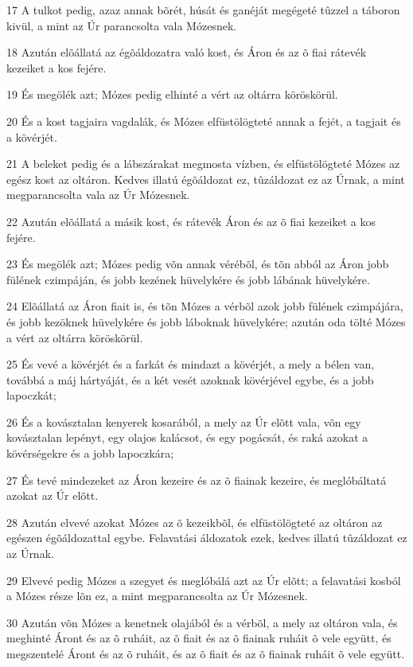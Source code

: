 \par 17 A tulkot pedig, azaz annak bõrét, húsát és ganéját megégeté tûzzel a táboron kivül, a mint az Úr parancsolta vala Mózesnek.
\par 18 Azután elõállatá az égõáldozatra való kost, és Áron és az õ fiai rátevék kezeiket a kos fejére.
\par 19 És megölék azt; Mózes pedig elhinté a vért az oltárra köröskörül.
\par 20 És a kost tagjaira vagdalák, és Mózes elfüstölögteté annak a fejét, a tagjait és a kövérjét.
\par 21 A beleket pedig és a lábszárakat megmosta vízben, és elfüstölögteté Mózes az egész kost az oltáron. Kedves illatú égõáldozat ez, tûzáldozat ez az Úrnak, a mint megparancsolta vala az Úr Mózesnek.
\par 22 Azután elõállatá a másik kost, és rátevék Áron és az õ fiai kezeiket a kos fejére.
\par 23 És megölék azt; Mózes pedig võn annak vérébõl, és tõn abból az Áron jobb fülének czimpáján, és jobb kezének hüvelykére és jobb lábának hüvelykére.
\par 24 Elõállatá az Áron fiait is, és tõn Mózes a vérbõl azok jobb fülének czimpájára, és jobb kezöknek hüvelykére és jobb láboknak hüvelykére; azután oda tölté Mózes a vért az oltárra köröskörül.
\par 25 És vevé a kövérjét és a farkát és mindazt a kövérjét, a mely a bélen van, továbbá a máj hártyáját, és a két vesét azoknak kövérjével egybe, és a jobb lapoczkát;
\par 26 És a kovásztalan kenyerek kosarából, a mely az Úr elõtt vala, võn egy kovásztalan lepényt, egy olajos kalácsot, és egy pogácsát, és raká azokat a kövérségekre és a jobb lapoczkára;
\par 27 És tevé mindezeket az Áron kezeire és az õ fiainak kezeire, és meglóbáltatá azokat az Úr elõtt.
\par 28 Azután elvevé azokat Mózes az õ kezeikbõl, és elfüstölögteté az oltáron az egészen égõáldozattal egybe. Felavatási áldozatok ezek, kedves illatú tûzáldozat ez az Úrnak.
\par 29 Elvevé pedig Mózes a szegyet és meglóbálá azt az Úr elõtt; a felavatási kosból a Mózes része lõn ez, a mint megparancsolta az Úr Mózesnek.
\par 30 Azután võn Mózes a kenetnek olajából és a vérbõl, a mely az oltáron vala, és meghinté Áront és az õ ruháit, az õ fiait és az õ fiainak ruháit õ vele együtt, és megszentelé Áront és az õ ruháit, és az õ fiait és az õ fiainak ruháit õ vele együtt.
